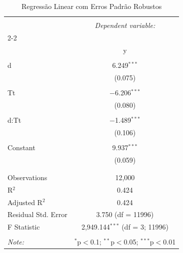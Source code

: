 \documentclass[
]{article}
\begin{document}
\begin{table}[!htbp] \centering 
  \caption{Regressão Linear com Erros Padrão Robustos} 
  \label{} 
\begin{tabular}{@{\extracolsep{5pt}}lc} 
\\[-1.8ex]\hline 
\hline \\[-1.8ex] 
 & \multicolumn{1}{c}{\textit{Dependent variable:}} \\ 
\cline{2-2} 
\\[-1.8ex] & y \\ 
\hline \\[-1.8ex] 
 d & 6.249$^{***}$ \\ 
  & (0.075) \\ 
  & \\ 
 Tt & $-$6.206$^{***}$ \\ 
  & (0.080) \\ 
  & \\ 
 d:Tt & $-$1.489$^{***}$ \\ 
  & (0.106) \\ 
  & \\ 
 Constant & 9.937$^{***}$ \\ 
  & (0.059) \\ 
  & \\ 
\hline \\[-1.8ex] 
Observations & 12,000 \\ 
R$^{2}$ & 0.424 \\ 
Adjusted R$^{2}$ & 0.424 \\ 
Residual Std. Error & 3.750 (df = 11996) \\ 
F Statistic & 2,949.144$^{***}$ (df = 3; 11996) \\ 
\hline 
\hline \\[-1.8ex] 
\textit{Note:}  & \multicolumn{1}{r}{$^{*}$p$<$0.1; $^{**}$p$<$0.05; $^{***}$p$<$0.01} \\ 
\end{tabular} 
\end{table}
\end{document}
